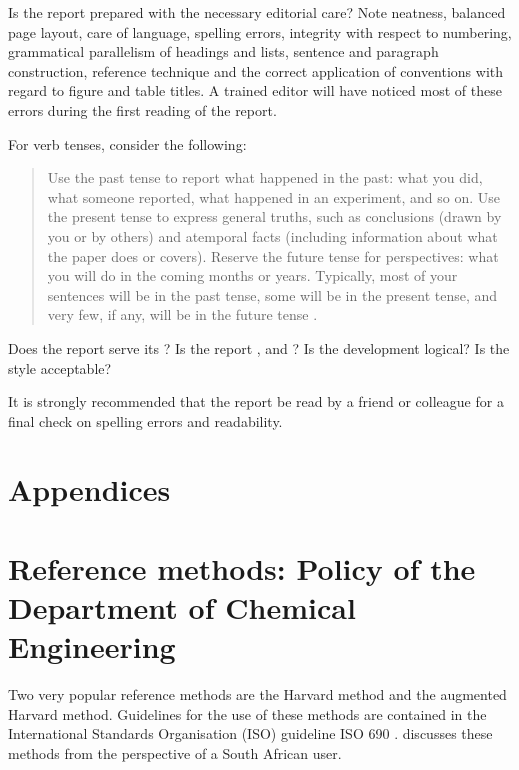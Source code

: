 \documentclass[a5paper, 10pt]{article}
\begin{document}
Is the report prepared with the necessary editorial care?  Note
neatness, balanced page layout, care of language, spelling errors,
integrity with respect to numbering, grammatical parallelism of
headings and lists, sentence and paragraph construction, reference
technique and the correct application of conventions with regard to
figure and table titles.  A trained editor will have noticed most of these errors during the first reading of the report.

For verb tenses, consider the following:

\begin{quote}
    Use the past tense to report what happened in the past: what you did, what someone reported, what happened in an experiment, and so on. Use the present tense to express general truths, such as conclusions (drawn by you or by others) and atemporal facts (including information about what the paper does or covers). Reserve the future tense for perspectives: what you will do in the coming months or years. Typically, most of your sentences will be in the past tense, some will be in the present tense, and very few, if any, will be in the future tense \citep{doumont}.
\end{quote}

Does the report serve its ?  Is the report
,  and ?  Is
the development logical?  Is the style acceptable?

It is strongly recommended that the report be read by a friend or
colleague for a final check on spelling errors and readability.

\newpage



\section{Appendices}
\appendix
\makeatletter
\def\@seccntformat#1{\csname Pref@#1\endcsname \csname the#1\endcsname\quad}
\def\Pref@section{Appendix~}
\makeatother

\section[Reference Methods: Policy of the Department of \\Chemical Engineering]{Reference methods: Policy of the \\Department of Chemical Engineering}
\label{app:reference_methods}
Two very popular reference methods are the Harvard method and the
augmented Harvard method.  Guidelines for the use of these methods are
contained in the International Standards Organisation (ISO) guideline
ISO 690 \citep{ISO690}.  \citet{burger} discusses these methods from
the perspective of a South African user.
\end{document}
